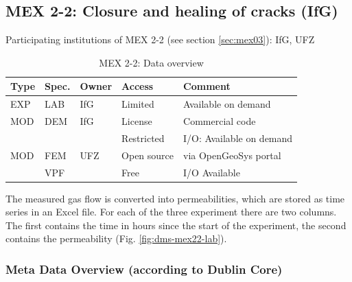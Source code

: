\subsection{MEX 2-2: Closure and healing of cracks (IfG)}

Participating institutions of MEX 2-2 (see section \ref{sec:mex03}): IfG, UFZ

\begin{table}[ht!]
\caption{MEX 2-2: Data overview}
\label{tab:dms-mex22-overview}
\small
\begin{tabular}{l|l|l|l|L{4.7cm}}
\hline
{}
Type & Spec. & Owner & Access     & Comment                       \\ 
\hline
EXP  & LAB   & IfG   & Limited    & Available on demand           \\
\hline \hline
MOD  & DEM   & IfG   & License    & Commercial code               \\
     &       &       & Restricted & I/O: Available on demand      \\
\hline
MOD  & FEM   & UFZ   & Open source & via OpenGeoSys portal        \\
     & VPF   &       & Free       & I/O Available                 \\
%
\hline
\end{tabular}
\end{table}
\normalsize

The measured gas flow is converted into permeabilities, which are stored as time series in an Excel file. For each of the three experiment there are two columns. The first contains the time in hours since the start of the experiment, the second contains the permeability (Fig. \ref{fig:dms-mex22-lab}). 

\subsubsection*{Meta Data Overview (according to Dublin Core)}

